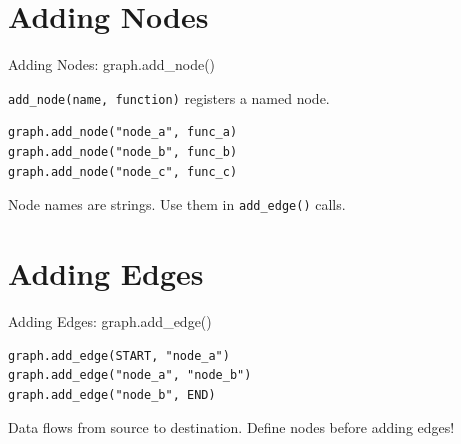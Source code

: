 \documentclass[aspectratio=169,11pt]{beamer}
\begin{document}
\section{Adding Nodes}
\begin{frame}[fragile,t]{Adding Nodes: graph.add\_node()}
\vspace{0.1cm}

\begin{conceptbox}
\texttt{add\_node(name, function)} registers a named node.
\end{conceptbox}

\vspace{0.1cm}

\begin{codebox}
\begin{lstlisting}
graph.add_node("node_a", func_a)
graph.add_node("node_b", func_b)
graph.add_node("node_c", func_c)
\end{lstlisting}
\end{codebox}

\vspace{0.1cm}

\begin{tipbox}[Names]
Node names are strings. Use them in \texttt{add\_edge()} calls.
\end{tipbox}
\end{frame}

\section{Adding Edges}
\begin{frame}[fragile,t]{Adding Edges: graph.add\_edge()}
\vspace{0.1cm}

\begin{codebox}
\begin{lstlisting}
graph.add_edge(START, "node_a")
graph.add_edge("node_a", "node_b")
graph.add_edge("node_b", END)
\end{lstlisting}
\end{codebox}

\vspace{0.15cm}

\begin{tipbox}
Data flows from source to destination. Define nodes before adding edges!
\end{tipbox}
\end{frame}
\end{document}
